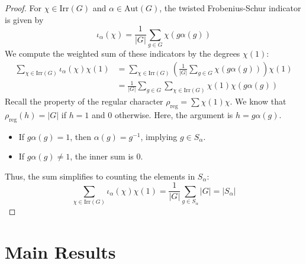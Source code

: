 \documentclass[oneside]{amsart}
\theoremstyle{plain}
\theoremstyle{definition}
\theoremstyle{remark}
\begin{document}
    \begin{proof}
         For $\chi \in \mathrm{Irr}(G)$ and $\alpha \in \text{Aut}(G)$, the twisted Frobenius-Schur indicator is given by
        \begin{equation}
            \iota_{\alpha}(\chi) = \frac{1}{|G|} \sum_{g \in G} \chi(g \alpha(g))
        \end{equation}
        We compute the weighted sum of these indicators by the degrees $\chi(1)$:
        \begin{align*}
            \sum_{\chi \in \mathrm{Irr}(G)} \iota_{\alpha}(\chi) \chi(1) &= \sum_{\chi \in \mathrm{Irr}(G)} \left( \frac{1}{|G|} \sum_{g \in G} \chi(g \alpha(g)) \right) \chi(1) \\
            &= \frac{1}{|G|} \sum_{g \in G} \sum_{\chi \in \mathrm{Irr}(G)} \chi(1) \chi(g \alpha(g))
        \end{align*}
        Recall the property of the regular character $\rho_{\text{reg}} = \sum \chi(1)\chi$. We know that $\rho_{\text{reg}}(h) = |G|$ if $h=1$ and $0$ otherwise. Here, the argument is $h = g \alpha(g)$.
        \begin{itemize}
            \item If $g \alpha(g) = 1$, then $\alpha(g) = g^{-1}$, implying $g \in S_{\alpha}$.
            \item If $g \alpha(g) \neq 1$, the inner sum is 0.
        \end{itemize}
        Thus, the sum simplifies to counting the elements in $S_{\alpha}$:
        \begin{equation}
            \sum_{\chi \in \mathrm{Irr}(G)} \iota_{\alpha}(\chi) \chi(1) = \frac{1}{|G|} \sum_{g \in S_{\alpha}} |G| = |S_{\alpha}|
        \end{equation}
    \end{proof}
\section{Main Results}
\end{document}
